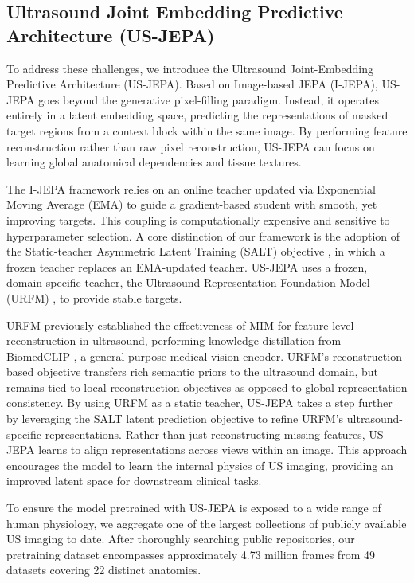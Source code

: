 \documentclass{article}
\theoremstyle{plain}
\theoremstyle{definition}
\theoremstyle{remark}
\begin{document}
\subsection{Ultrasound Joint Embedding Predictive Architecture (US-JEPA)}

To address these challenges, we introduce the Ultrasound Joint-Embedding Predictive Architecture (US-JEPA). Based on Image-based JEPA (I-JEPA), US-JEPA goes beyond the generative pixel-filling paradigm. Instead, it operates entirely in a latent embedding space, predicting the representations of masked target regions from a context block within the same image. By performing feature reconstruction rather than raw pixel reconstruction, US-JEPA can focus on learning global anatomical dependencies and tissue textures.

The I-JEPA framework \cite{assran_self-supervised_2023} relies on an online teacher updated via Exponential Moving Average (EMA) to guide a gradient-based student with smooth, yet improving targets. This coupling is computationally expensive and sensitive to hyperparameter selection. A core distinction of our framework is the adoption of the Static-teacher Asymmetric Latent Training (SALT) objective \cite{li_rethinking_2025}, in which a frozen teacher replaces an EMA-updated teacher. US-JEPA uses a frozen, domain-specific teacher, the Ultrasound Representation Foundation Model (URFM) \cite{kang_urfm_2025}, to provide stable targets.

URFM previously established the effectiveness of MIM for feature-level reconstruction in ultrasound, performing knowledge distillation from BiomedCLIP \cite{zhang_multimodal_2025}, a general-purpose medical vision encoder. URFM’s reconstruction-based objective transfers rich semantic priors to the ultrasound domain, but remains tied to local reconstruction objectives as opposed to global representation consistency. By using URFM as a static teacher, US-JEPA takes a step further by leveraging the SALT latent prediction objective to refine URFM’s ultrasound-specific representations. Rather than just reconstructing missing features, US-JEPA learns to align representations across views within an image. This approach encourages the model to learn the internal physics of US imaging, providing an improved latent space for downstream clinical tasks.

To ensure the model pretrained with US-JEPA is exposed to a wide range of human physiology, we aggregate one of the largest collections of publicly available US imaging to date. After thoroughly searching public repositories, our pretraining dataset encompasses approximately 4.73 million frames from 49 datasets covering 22 distinct anatomies.
\end{document}
